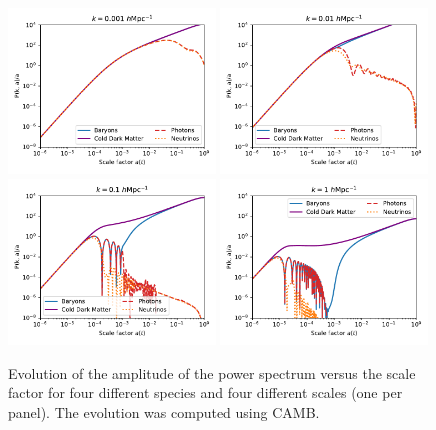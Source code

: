     \begin{figure}
        \centering
        \includegraphics[width=0.49\textwidth]{fig/intro/pk_versus_time_k0.001.pdf}
        \includegraphics[width=0.49\textwidth]{fig/intro/pk_versus_time_k0.01.pdf}
        \includegraphics[width=0.49\textwidth]{fig/intro/pk_versus_time_k0.1.pdf}
        \includegraphics[width=0.49\textwidth]{fig/intro/pk_versus_time_k1.pdf}
        \caption{Evolution of the amplitude of the power spectrum versus the scale factor 
        for four different species and four different scales (one per panel). 
        The evolution was computed using \textsc{CAMB}.}
        \label{fig:pk_evolution}
    \end{figure}

